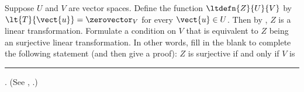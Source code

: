Suppose $U$ and $V$ are vector spaces.  Define the function $\ltdefn{Z}{U}{V}$ by $\lt{T}{\vect{u}}=\zerovector_{V}$ for every $\vect{u}\in U$.  Then by , $Z$ is a linear transformation.  Formulate a condition on $V$ that is equivalent to $Z$ being an surjective linear transformation.   In other words, fill in the blank to complete the following statement (and then give a proof):  $Z$ is surjective if and only if $V$ is \rule{1in}{1pt}. (See , .)